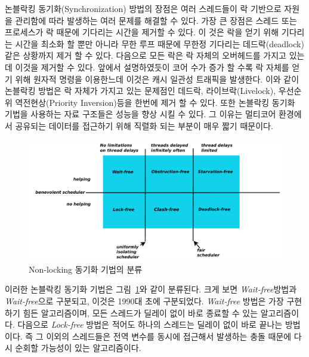 논블락킹 동기화(Synchronization) 방법의 장점은 여러 스레드들이 락 기반으로 자원을 관리함에 따라 
발생하는 여러 문제를 해결할 수 있다.
가장 큰 장점은 스레드 또는 프로세스가 락 때문에 기다리는 시간을 제거할 수 있다.
이 것은 락을 얻기 위해 기다리는 시간을 최소화 할 뿐만 아니라 무한 루프 때문에 무한정 기다리는 
데드락(deadlock) 같은 상황까지 제거 할 수 있다. 
다음으로 모든 락은 락 자체의 오버헤드를 가지고 있는데 이것을 제거할 수 있다. 
앞에서 설명하였듯이 코어 수가 증가 할 수록 락 자체를 얻기 위해 원자적 명령을 이용한느데 이것은 캐시 일관성 트래픽을 
발생한다. 
이와 같이 논블락킹 방법은 락 자체가 가지고 있는 문제점인 데드락, 라이브락(Livelock), 
우선순위 역전현상(Priority Inversion)등을 한번에 제거 할 수 있다. 
또한 논블락킹 동기화 기법을 사용하는  자료 구조들은 성능을 향상 시킬 수 있다. 
그 이유는 멀티코어 환경에서 공유되는 데이터를 접근하기 위해 직렬화 되는 부분이 매우 짧기 때문이다. 

\begin{figure}[h!]
    \centering
    \includegraphics[width=1\textwidth]{fig/NBS/NBS}
    \caption{Non-locking 동기화 기법의 분류}
  \label{fig:NBS}
\end{figure}


이러한 논블락킹 동기화 기법은 그림~\ref{fig:NBS}와 같이 분류된다.
크게 보면 \textit{Wait-free}방법과 \textit{Wait-free}으로 구분되고, 이것은 1990대 초에 구분되었다.  
\textit{Wait-free} 방법은 가장 구현하기 힘든 알고리즘이며, 모든 스레드가 딜레이 없이 바로 종료할 수 
있는 알고리즘이다. 
다음으로 \textit{Lock-free} 방법은 적어도 하나의 스레드는 딜레이 없이 바로 끝나는 방법이다. 
즉 그 이외의 스레드들은 전역 변수를 동시에 접근해서 발생하는 충돌 때문에 다시 순회할 가능성이 있는 
알고리즘이다.

